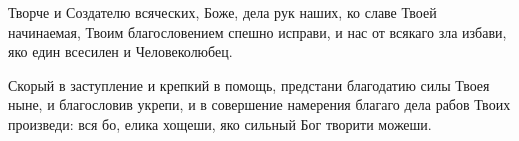 

\label{_content_razlichnie_molitvi}



\begin{mymulticols}





Творче и Создателю всяческих, Боже, дела рук наших, ко славе Твоей начинаемая, Твоим благословением спешно исправи, и нас от всякаго зла избави, яко един всесилен и Человеколюбец.




Скорый в заступление и крепкий в помощь, предстани благодатию силы Твоея ныне, и благословив укрепи, и в совершение намерения благаго дела рабов Твоих произведи: вся бо, елика хощеши, яко сильный Бог творити можеши.

\end{mymulticols}

\mychapterending


